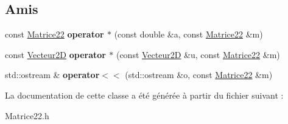 \subsection*{Amis}
\begin{DoxyCompactItemize}
\item 
\mbox{\label{class_matrice22_aa8e8813399d7b5b6b7c2318ec1867bd9}} 
const \mbox{\hyperlink{class_matrice22}{Matrice22}} {\bfseries operator $\ast$} (const double \&a, const \mbox{\hyperlink{class_matrice22}{Matrice22}} \&m)
\item 
\mbox{\label{class_matrice22_a4dfc2274b21872ab2db9471b941fc20e}} 
const \mbox{\hyperlink{class_vecteur2_d}{Vecteur2D}} {\bfseries operator $\ast$} (const \mbox{\hyperlink{class_vecteur2_d}{Vecteur2D}} \&u, const \mbox{\hyperlink{class_matrice22}{Matrice22}} \&m)
\item 
\mbox{\label{class_matrice22_ae011855287c25e07ed27203fdd0b92ed}} 
std\+::ostream \& {\bfseries operator$<$$<$} (std\+::ostream \&o, const \mbox{\hyperlink{class_matrice22}{Matrice22}} \&m)
\end{DoxyCompactItemize}


La documentation de cette classe a été générée à partir du fichier suivant \+:\begin{DoxyCompactItemize}
\item 
Matrice22.\+h\end{DoxyCompactItemize}
